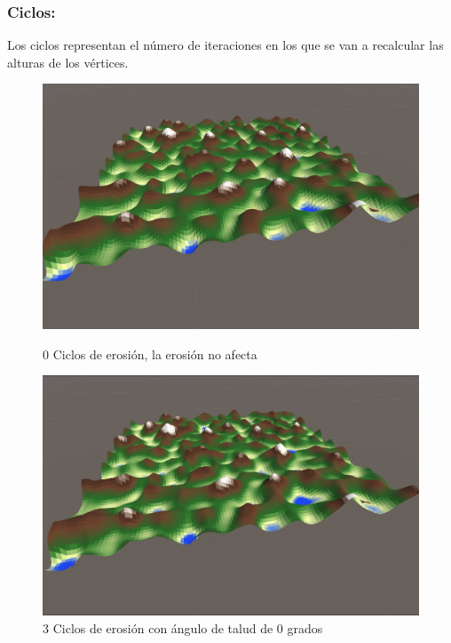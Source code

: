 \subsubsection{Ciclos: }Los ciclos representan el número de iteraciones en los que se van a recalcular las alturas de los vértices. 
\begin{figure}[ht]
    \centering
    \begin{minipage}{0.35\textwidth}
        \centering
        \includegraphics[width=\textwidth]{img/0ciclos.png}
        \caption{0 Ciclos de erosión, la erosión no afecta}
    \end{minipage}%
    \hfill
    \begin{minipage}{0.35\textwidth}
        \centering
        \includegraphics[width=\textwidth]{img/3ciclos.png}
        \caption{3 Ciclos de erosión con ángulo de talud de 0 grados}
    \end{minipage}
    

\end{figure}

